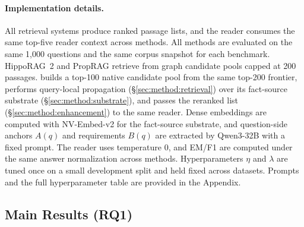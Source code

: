 \paragraph{Implementation details.}
All retrieval systems produce ranked passage lists, and the reader
consumes the same top-five reader context across methods. All methods
are evaluated on the same 1{,}000 questions and the same corpus
snapshot for each benchmark. HippoRAG~2 and PropRAG retrieve from graph
candidate pools capped at 200 passages.
\methodname{} builds a top-100 native candidate pool from the same
top-200 frontier, performs query-local propagation
(\S\ref{sec:method:retrieval}) over its fact-source substrate
(\S\ref{sec:method:substrate}), and passes the reranked list
(\S\ref{sec:method:enhancement}) to the same reader. Dense embeddings
are computed with NV-Embed-v2 for the fact-source substrate, and
question-side anchors $A(q)$ and requirements $B(q)$ are extracted by
Qwen3-32B with a fixed prompt. The reader uses temperature 0, and
EM/F1 are computed under the same answer normalization across methods.
Hyperparameters $\eta$ and $\lambda$ are tuned once on a small
development split and held fixed across datasets. Prompts and the full
hyperparameter table are provided in the Appendix.

\subsection{Main Results (RQ1)}
\label{sec:experiments:main}

